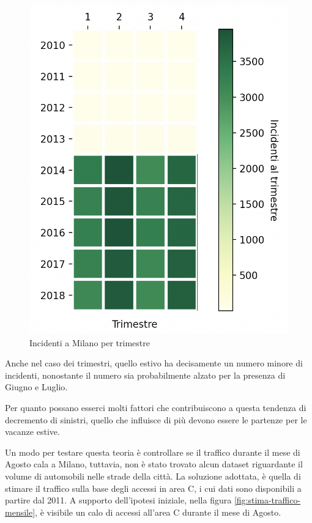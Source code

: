 \documentclass[a4paper]{report}
\begin{document}
\begin{figure}
    \includegraphics[width=\linewidth]{../src/incidenti/incidenti_senza_coords/mese_incidenti/trimestri.png}
    \caption{Incidenti a Milano per trimestre}
    \label{fig:milano-trimestri}
\end{figure}

Anche nel caso dei trimestri, quello estivo ha decisamente un numero minore di incidenti, 
nonostante il numero sia probabilmente alzato per la presenza di Giugno e Luglio.

Per quanto possano esserci molti fattori che contribuiscono a questa tendenza di decremento di sinistri, 
quello che influisce di più devono essere le partenze per le vacanze estive.

Un modo per testare questa teoria è controllare se il traffico durante il mese di Agosto cala a Milano, 
tuttavia, non è stato trovato alcun dataset riguardante il volume di automobili nelle strade della città.
La soluzione adottata, è quella di stimare il traffico sulla base degli accessi in area C, i cui dati 
sono disponibili a partire dal 2011.
A supporto dell'ipotesi iniziale, nella figura \ref{fig:stima-traffico-mensile}, 
è visibile un calo di accessi all'area C durante il mese di Agosto.
\end{document}
